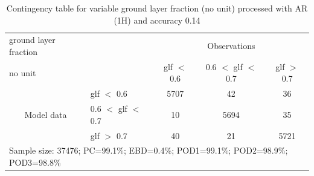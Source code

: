 \begin{table}[]
\begin{center}
\begin{tabular}{llccc}
\hline
{ground layer fraction}                                       &                                                    & \multicolumn{3}{c}{Observations}                 \\
{no unit}                                       &                             & glf $<$ 0.6   & 0.6 $<$ glf $<$ 0.7 & glf $>$ 0.7 \\
\hline
\multicolumn{1}{c}{\multirow{3}{*}{Model data}}  & glf $<$ 0.6             & 5707                & 42                       & 36              \\
                                                 & 0.6  $<$ glf $<$ 0.7 & 10                & 5694                       & 35              \\
                                                 & glf $>$ 0.7             & 40                & 21                       & 5721              \\
\hline
\multicolumn{5}{l}{Sample size: 37476; PC=99.1\%; EBD=0.4\%; POD1=99.1\%; POD2=98.9\%; POD3=98.8\%}
\end{tabular}
\end{center}
\caption{Contingency table for variable ground layer fraction (no unit) processed with AR (1H) and accuracy 0.14}
\label{tab:contingencyglfAFT}
\end{table}
